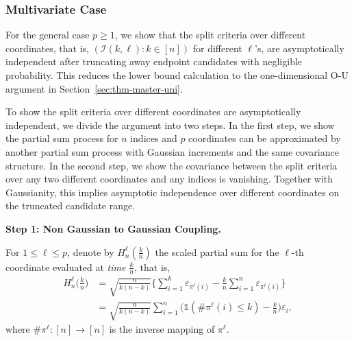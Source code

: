 \documentclass[10pt]{article}
\def\I{\mathscr{I}}
\newcommand{\Indicator}{\mathds{1}}
\theoremstyle{definition}
\theoremstyle{remark}
\begin{document}
\subsubsection*{Multivariate Case}\label{sec:thm-master-multi}

For the general case $p \geq 1$, we show that the split criteria over different coordinates, that is, $(\I(k,\ell): k \in [n])$ for different $\ell$'s, are asymptotically independent after truncating away endpoint candidates with negligible probability. This reduces the lower bound calculation to the one-dimensional O-U argument in Section~\ref{sec:thm-master-uni}.

To show the split criteria over different coordinates are asymptotically independent, we divide the argument into two steps. In the first step, we show the partial sum process for $n$ indices and $p$ coordinates can be approximated by another partial sum process with Gaussian increments and the same covariance structure. In the second step, we show the covariance between the split criteria over any two different coordinates and any indices is vanishing. Together with Gaussianity, this implies asymptotic independence over different coordinates on the truncated candidate range.

\begin{center}
    \textbf{Step 1: Non Gaussian to Gaussian Coupling.}
\end{center}
For $1 \leq \ell \leq p$, denote by $H_n^\ell(\frac{k}{n})$ the scaled partial sum for the $\ell$-th coordinate evaluated at \textit{time} $\frac{k}{n}$, that is,
\begin{align*}
    H_n^\ell\bigg(\frac{k}{n}\bigg) & = \sqrt{\frac{n}{k(n-k)}} \bigg\{\sum_{i = 1}^k \varepsilon_{\pi^\ell(i)} - \frac{k}{n} \sum_{i = 1}^n \varepsilon_{\pi^\ell(i)} \bigg\} \\
    & = \sqrt{\frac{n}{k(n-k)}} \sum_{i=1}^n \Big(\Indicator(\#\pi^{\ell}(i) \leq k) - \frac{k}{n}\Big) \varepsilon_i,
\end{align*}
where $\# \pi^{\ell}:[n] \rightarrow [n]$ is the inverse mapping of $\pi^{\ell}$. 
\end{document}

